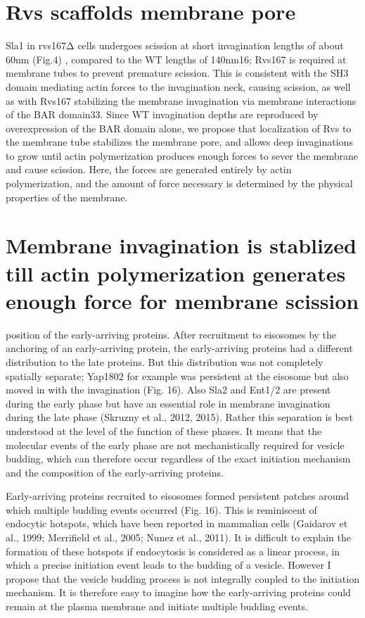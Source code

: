 \section{Rvs scaffolds membrane pore}
Sla1 in rvs167Δ cells undergoes scission at short invagination lengths of about 60nm (Fig.4) , compared to the WT lengths of 140nm16; Rvs167 is required at membrane tubes to prevent premature scission. This is consistent with the SH3 domain mediating actin forces to the invagination neck, causing scission, as well as with Rvs167 stabilizing the membrane invagination via membrane interactions of the BAR domain33. Since WT invagination depths are reproduced by overexpression of the BAR domain alone, we propose that localization of Rvs to the membrane tube stabilizes the membrane pore, and allows deep invaginations to grow until actin polymerization produces enough forces to sever the membrane and cause scission. Here, the forces are generated entirely by actin polymerization, and the amount of force necessary is determined by the physical properties of the membrane.

\section{  Membrane invagination is stablized till actin polymerization generates enough force for membrane scission}

\newpage

position of the early-arriving proteins. After recruitment to eisosomes by the anchoring of an early-arriving protein, the early-arriving proteins had a different distribution to the late proteins. But this distribution was not completely spatially separate; Yap1802 for example was persistent at the eisosome but also moved in with the invagination (Fig. 16). Also Sla2 and Ent1/2 are present during the early phase but have an essential role in membrane invagination during the late phase (Skruzny et al., 2012, 2015). Rather this separation is best understood at the level of the function of these phases. It means that the molecular events of the early phase are not mechanistically required for vesicle budding, which can therefore occur regardless of the exact initiation mechanism and the composition of the early-arriving proteins. 


\vspace{2mm}
Early-arriving proteins recruited to eisosomes formed persistent patches around which multiple budding events occurred (Fig. 16). This is reminiscent of endocytic hotspots, which have been reported in mammalian cells (Gaidarov et al., 1999; Merrifield et al., 2005; Nunez et al., 2011). It is difficult to explain the formation of these hotspots if endocytosis is considered as a linear process, in which a precise initiation event leads to the budding of a vesicle. However I propose that the vesicle budding process is not integrally coupled to the initiation mechanism. It is therefore easy to imagine how the early-arriving proteins could remain at the plasma membrane and initiate multiple budding events. 

